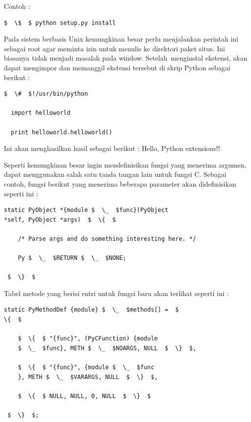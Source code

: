 Contoh : 
\begin{verbatim}
$  \$  $ python setup.py install
\end{verbatim}
  
\vspace{12pt}
\hspace*{0.5in} Pada sistem berbasis Unix kemungkinan besar perlu menjalankan perintah ini sebagai root agar meminta izin untuk menulis ke direktori paket situs. Ini biasanya tidak menjadi masalah pada window. 
Setelah~menginstal ekstensi, akan dapat mengimpor dan memanggil ekstensi tersebut di skrip Python  sebagai berikut : 
\begin{verbatim}
$  \#  $!/usr/bin/python

  import helloworld 

  print helloworld.helloworld() 
\end{verbatim}

\vspace{12pt}
Ini akan menghasilkan hasil sebagai berikut  : 
Hello, Python extensions!! 

\vspace{12pt}
Seperti kemungkinan besar ingin mendefinisikan fungsi yang menerima argumen, dapat menggunakan salah satu tanda tangan lain untuk fungsi C. Sebagai contoh, fungsi berikut yang menerima beberapa parameter akan didefinisikan seperti ini : 
\begin{verbatim}
static PyObject *{module $  \_  $func}(PyObject 
*self, PyObject *args)  $  \{  $ 

    /* Parse args and do something interesting here. */ 

    Py $  \_  $RETURN $  \_  $NONE; 

 $  \}  $ 
\end{verbatim}

\vspace{12pt}
Tabel metode yang berisi entri untuk fungsi baru akan terlihat seperti ini : 
\begin{verbatim}
static PyMethodDef {module} $  \_  $methods[] =  $  
\{  $ 

    $  \{  $ "{func}", (PyCFunction) {module
    $  \_  $func}, METH $  \_  $NOARGS, NULL  $  \}  $, 

    $  \{  $ "{func}", {module $  \_  $func
    }, METH $  \_  $VARARGS, NULL  $  \}  $, 

    $  \{  $ NULL, NULL, 0, NULL  $  \}  $ 

 $  \}  $; 
\end{verbatim}

